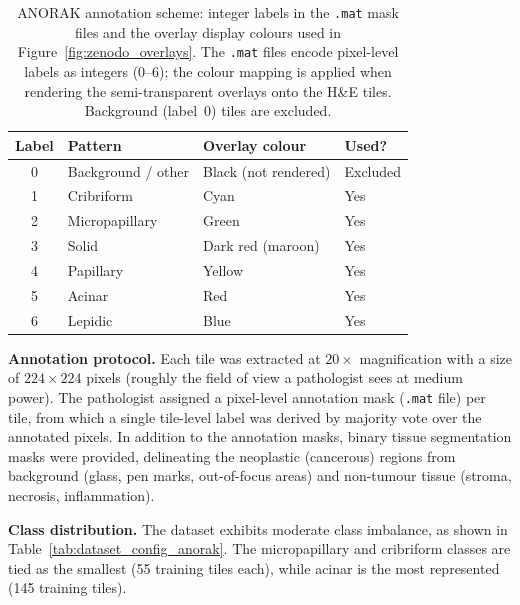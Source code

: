 \begin{table}[ht!]
\centering
\small
\caption{ANORAK annotation scheme: integer labels in the
\texttt{.mat} mask files and the overlay display colours used in
Figure~\ref{fig:zenodo_overlays}.
The \texttt{.mat} files encode pixel-level labels as integers (0--6);
the colour mapping is applied when rendering the semi-transparent
overlays onto the H\&E tiles.
Background (label~0) tiles are excluded.}
\label{tab:variant_types_patterns}
\begin{tabular}{c l l l}
\hline
\textbf{Label} & \textbf{Pattern} & \textbf{Overlay colour} & \textbf{Used?} \\
\hline
0 & Background / other    & Black (not rendered)  & Excluded \\
1 & Cribriform            & Cyan                  & Yes \\
2 & Micropapillary        & Green                 & Yes \\
3 & Solid                 & Dark red (maroon)     & Yes \\
4 & Papillary             & Yellow                & Yes \\
5 & Acinar                & Red                   & Yes \\
6 & Lepidic               & Blue                  & Yes \\
\hline
\end{tabular}
\end{table}

\textbf{Annotation protocol.}
Each tile was extracted at $20\times$ magnification with a size of
$224 \times 224$ pixels (roughly the field of view a pathologist sees
at medium power).
The pathologist assigned a pixel-level annotation mask
(\texttt{.mat} file) per tile, from which a single tile-level
label was derived by majority vote over the annotated pixels.
In addition to the annotation masks, binary tissue segmentation masks
were provided, delineating the neoplastic (cancerous) regions from
background (glass, pen marks, out-of-focus areas) and non-tumour tissue
(stroma, necrosis, inflammation).

\textbf{Class distribution.}
The dataset exhibits moderate class imbalance, as shown in
Table~\ref{tab:dataset_config_anorak}.
The micropapillary and cribriform classes are tied as the smallest
(55 training tiles each), while acinar is the most represented
(145 training tiles).

